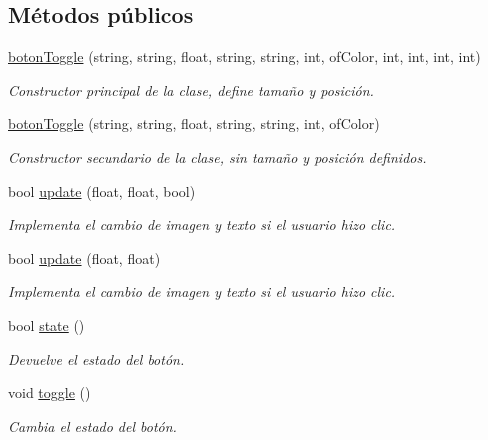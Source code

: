 \subsection*{Métodos públicos}
\begin{DoxyCompactItemize}
\item 
\hyperlink{classboton_toggle_a53ca0ae03d7125318e8b88993f8ed936}{boton\+Toggle} (string, string, float, string, string, int, of\+Color, int, int, int, int)
\begin{DoxyCompactList}\small\item\em Constructor principal de la clase, define tamaño y posición. \end{DoxyCompactList}\item 
\hyperlink{classboton_toggle_ad193dda2df6e4399a3171a2d5ecc612f}{boton\+Toggle} (string, string, float, string, string, int, of\+Color)
\begin{DoxyCompactList}\small\item\em Constructor secundario de la clase, sin tamaño y posición definidos. \end{DoxyCompactList}\item 
bool \hyperlink{classboton_toggle_abdba9bf27d77ddcd56c83bb494ddebb7}{update} (float, float, bool)
\begin{DoxyCompactList}\small\item\em Implementa el cambio de imagen y texto si el usuario hizo clic. \end{DoxyCompactList}\item 
bool \hyperlink{classboton_toggle_ad7f6623575a6e17544bd9fd9bef18c8a}{update} (float, float)
\begin{DoxyCompactList}\small\item\em Implementa el cambio de imagen y texto si el usuario hizo clic. \end{DoxyCompactList}\item 
bool \hyperlink{classboton_toggle_a6da75216bda1e716f10cb1baec792cd0}{state} ()
\begin{DoxyCompactList}\small\item\em Devuelve el estado del botón. \end{DoxyCompactList}\item 
void \hyperlink{classboton_toggle_a5a24ccd035199173e96b36a9dec4927f}{toggle} ()
\begin{DoxyCompactList}\small\item\em Cambia el estado del botón. \end{DoxyCompactList}\end{DoxyCompactItemize}
